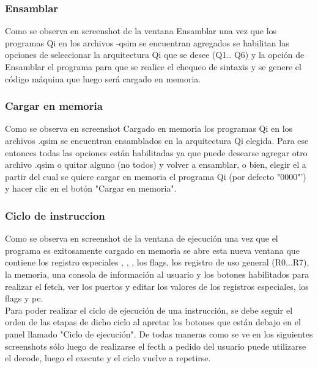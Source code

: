 \subsubsection{Ensamblar}
Como se observa en screenshot de la ventana Ensamblar una vez que los programas Qi en los archivos -qsim se encuentran agregados se habilitan las opciones de seleccionar la arquitectura Qi que se desee (Q1.. Q6) y la opción de Ensamblar el programa para que se realice el chequeo de sintaxis y se genere el código máquina que luego será cargado en memoria.


\subsubsection{Cargar en memoria}
Como se observa en screenshot Cargado en memoria los programas Qi en los archivos .qsim se encuentran ensamblados en la arquitectura Qi elegida.
Para ese entonces todas las opciones están habilitadas ya que puede desearse agregar otro archivo .qsim o quitar alguno (no todos) y volver a ensamblar, o bien, elegir el \PC a partir del cual se quiere cargar en memoria el programa Qi (por defecto "0000"') y hacer clic en el botón "Cargar en memoria".

\subsubsection{Ciclo de instruccion}
Como se observa en screenshot de la ventana de ejecución una vez que el programa es exitosamente cargado en memoria se abre esta nueva ventana que contiene los registro especiales \PC, \IR, \SP, los flags, los registro de uso general (R0...R7), la memoria, una consola de información al usuario y los botones habilitados para realizar el fetch, ver los puertos y editar los valores de los registros especiales, los flags y pc.
\\
Para poder realizar el ciclo de ejecución de una instrucción, se debe seguir el orden de las etapas de dicho ciclo al apretar los botones que están debajo en el panel llamado "Ciclo de ejecución". De todas maneras como se ve en los siguientes screenshots sólo luego de realizarse el fecth a pedido del usuario puede utilizarse el decode, luego el execute y el ciclo vuelve a repetirse.\\

\\
\\
\\

